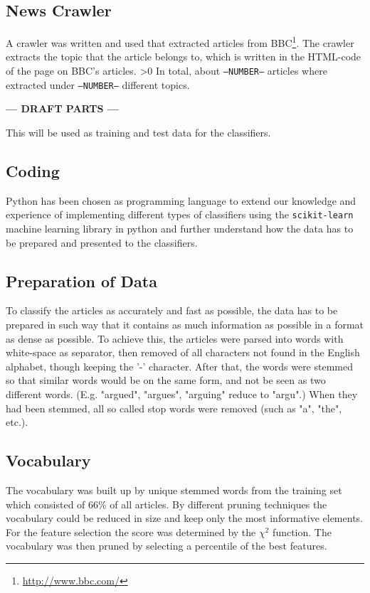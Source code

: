 \subsection{News Crawler}
A crawler was written and used that extracted articles from BBC\footnote{\url{http://www.bbc.com/}}. The crawler extracts the topic that the article belongs to, which is written in the HTML-code of the page on BBC's articles. 
\ifnum\printdraft>0
	In total, about \texttt{--NUMBER--} articles where extracted under \texttt{--NUMBER--} different topics.
\else
\begin{center}
  	\textbf{--- DRAFT PARTS ---}
\end{center}
\fi
This will be used as training and test data for the classifiers.
\subsection{Coding}
Python has been chosen as programming language to extend our knowledge and experience of implementing different types of classifiers using the \texttt{scikit-learn} machine learning library in python and further understand how the data has to be prepared and presented to the classifiers.
\subsection{Preparation of Data}
To classify the articles as accurately and fast as possible, the data has to be prepared in such way that it contains as much information as possible in a format as dense as possible. To achieve this, the articles were parsed into words with white-space as separator, then removed of all characters not found in the English alphabet, though keeping the '-' character. After that, the words were stemmed so that similar words would be on the same form, and not be seen as two different words. (E.g. "argued", "argues", "arguing" reduce to "argu".) When they had been stemmed, all so called stop words were removed (such as "a", "the", etc.). 
\subsection{Vocabulary}
The vocabulary was built up by unique stemmed words from the training set which consisted of 66\% of all articles. By different pruning techniques the vocabulary could be reduced in size and keep only the most informative elements. For the feature selection the score was determined by the $\chi^2$ function. The vocabulary was then pruned by selecting a percentile of the best features.
